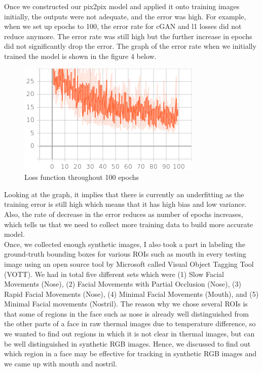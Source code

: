 \documentclass[conference]{IEEEtran}
\begin{document}
Once we constructed our pix2pix model and applied it onto training images initially, the outputs were not adequate, and the error was high. For example, when we set up epochs to 100, the error rate for cGAN and l1 losses did not reduce anymore. The error rate was still high but the further increase in epochs did not significantly drop the error. The graph of the error rate when we initially trained the model is shown in the figure 4 below.\\
\begin{figure}[htbp]
\centerline{\includegraphics[scale=0.7]{gen_total_loss.png}}
\caption{Loss function throughout 100 epochs}
\label{fig}
\end{figure}
Looking at the graph, it implies that there is currently an underfitting as the training error is still high which means that it has high bias and low variance. Also, the rate of decrease in the error reduces as number of epochs increases, which tells us that we need to collect more training data to build more accurate model.\\
Once, we collected enough synthetic images, I also took a part in labeling the ground-truth bounding boxes for various ROIs such as mouth in every testing image using an open source tool by Microsoft called Visual Object Tagging Tool (VOTT)\cite{b17}. We had in total five different sets which were (1) Slow Facial Movements (Nose), (2) Facial Movements with Partial Occlusion (Nose), (3) Rapid Facial Movements (Nose), (4) Minimal Facial Movements (Mouth), and (5) Minimal Facial movements (Nostril). The reason why we chose several ROIs is that some of regions in the face such as nose is already well distinguished from the other parts of a face in raw thermal images due to temperature difference, so we wanted to find out regions in which it is not clear in thermal images, but can be well distinguished in synthetic RGB images. Hence, we discussed to find out which region in a face may be effective for tracking in synthetic RGB images and we came up with mouth and nostril.
\end{document}
